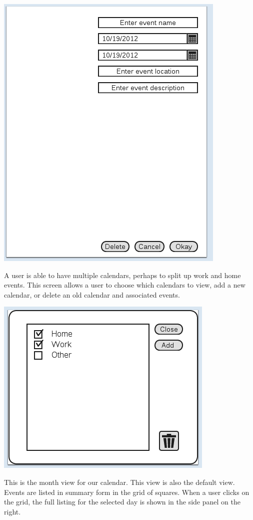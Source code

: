 \documentclass{article}
\begin{document}
\includegraphics[scale=0.5]{CMCLGDREvent.png}

A user is able to have multiple calendars, perhaps to split up work and home
events. This screen allows a user to choose which calendars to view, add a new
calendar, or delete an old calendar and associated events.

\includegraphics[scale=0.5]{CMCLGDRViewCalendar.png}

\pagebreak

This is the month view for our calendar. This view is also the default view.
Events are listed in summary form in the grid of squares. When a user clicks on
the grid, the full listing for the selected day is shown in the side panel on
the right.
\end{document}
